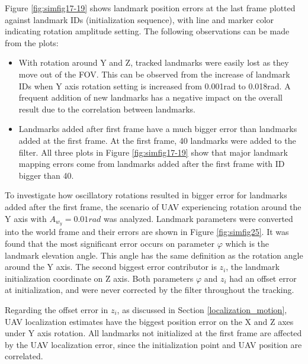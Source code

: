 Figure \ref{fig:simfig17-19} shows landmark position errors at
the last frame plotted against landmark IDs (initialization
sequence), with line and marker color indicating rotation amplitude
setting. The following observations can be made from the plots:

\begin{itemize}
  \item With rotation around Y and Z, tracked landmarks were easily lost
  as they move out of the FOV. This can be observed from the increase of
  landmark IDs when Y axis rotation setting is increased from 0.001rad to
  0.018rad. A frequent addition of new landmarks has a negative impact on
  the overall result due to the correlation between landmarks.
  \item Landmarks added after first frame have a much bigger error than
  landmarks added at the first frame. At the first frame, 40 landmarks were
  added to the filter. All three plots in Figure \ref{fig:simfig17-19}
  show that major landmark mapping errors come from landmarks added
  after the first frame with ID bigger than 40.
\end{itemize}
\FloatBarrier

To investigate how oscillatory rotations resulted in bigger error for
landmarks added after the first frame, the scenario of UAV
experiencing rotation around the Y axis with $A_{w_y}=0.01rad$ was
analyzed. Landmark parameters were converted into the world frame and
their errors are shown in Figure \ref{fig:simfig25}. It was found that
the most significant error occurs on parameter $\varphi$ which is the
landmark elevation angle. This angle has the same definition as the
rotation angle around the Y axis. The second biggest error contributor
is $z_i$, the landmark initialization coordinate on Z axis. Both
parameters $\varphi$ and $z_i$ had an offset error at initialization, and
were never corrected by the filter throughout the tracking.

Regarding the offset error in $z_i$, as discussed in Section
\ref{localization_motion}, UAV localization estimates have the biggest
position error on the X and Z axes under Y axis rotation. All landmarks
not initialized at the first frame are affected by the UAV
localization error, since the initialization point and UAV position
are correlated.

